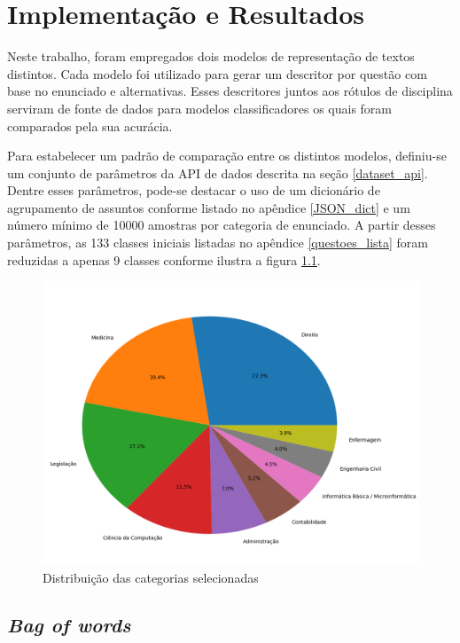 \chapter{Implementação e Resultados}
\label{chapter:implementacaoResultados}
\noindent
Neste trabalho, foram empregados dois modelos de representação de textos distintos. Cada modelo foi utilizado para gerar um descritor por questão com base no enunciado e alternativas. Esses descritores juntos aos rótulos de disciplina serviram de fonte de dados para modelos classificadores os quais foram comparados pela sua acurácia.

Para estabelecer um padrão de comparação entre os distintos modelos, definiu-se um conjunto de parâmetros da API de dados descrita na seção \ref{dataset_api}. Dentre esses parâmetros, pode-se destacar o uso de um dicionário de agrupamento de assuntos conforme listado no apêndice \ref{JSON_dict} e um número mínimo de 10000 amostras por categoria de enunciado. A partir desses parâmetros, as 133 classes iniciais listadas no apêndice \ref{questoes_lista} foram reduzidas a apenas 9 classes conforme ilustra a figura \ref{fig:pie_labels_graph}.

\begin{figure}[!ht]
	\centering
	\includegraphics[width=1.0\textwidth]{figures/pie_graph.png}
	\caption{Distribuição das categorias selecionadas}
	\label{fig:pie_labels_graph}
\end{figure}

\section{\textit{Bag of words}} \label{bow_implementation}

